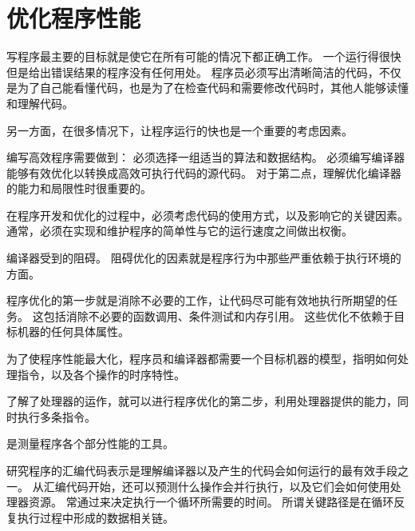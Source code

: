 
\chapter{优化程序性能}
{
    写程序最主要的目标就是使它在所有可能的情况下都正确工作。
    一个运行得很快但是给出错误结果的程序没有任何用处。
    程序员必须写出清晰简洁的代码，不仅是为了自己能看懂代码，也是为了在检查代码和需要修改代码时，其他人能够读懂和理解代码。

    另一方面，在很多情况下，让程序运行的快也是一个重要的考虑因素。

    编写高效程序需要做到：
    必须选择一组适当的算法和数据结构。
    必须编写编译器能够有效优化以转换成高效可执行代码的源代码。
    对于第二点，理解优化编译器的能力和局限性时很重要的。

    在程序开发和优化的过程中，必须考虑代码的使用方式，以及影响它的关键因素。
    通常，必须在实现和维护程序的简单性与它的运行速度之间做出权衡。

    编译器受到的阻碍。
    阻碍优化的因素就是程序行为中那些严重依赖于执行环境的方面。

    程序优化的第一步就是消除不必要的工作，让代码尽可能有效地执行所期望的任务。
    这包括消除不必要的函数调用、条件测试和内存引用。
    这些优化不依赖于目标机器的任何具体属性。

    为了使程序性能最大化，程序员和编译器都需要一个目标机器的模型，指明如何处理指令，以及各个操作的时序特性。

    了解了处理器的运作，就可以进行程序优化的第二步，利用处理器提供的能力，同时执行多条指令。

    是测量程序各个部分性能的工具。

    研究程序的汇编代码表示是理解编译器以及产生的代码会如何运行的最有效手段之一。
    从汇编代码开始，还可以预测什么操作会并行执行，以及它们会如何使用处理器资源。
    常通过来决定执行一个循环所需要的时间。
    所谓关键路径是在循环反复执行过程中形成的数据相关链。

    
}

\cleardoublepage

\endinput
